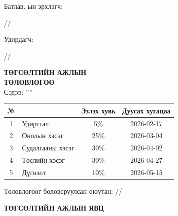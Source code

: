 
\begin{titlepage}

\vspace*{0.5cm}
Батлав. \deptname ын эрхлэгч: 
\begin{flushright}
\makebox[4cm]{\dotfill} /\chairname/ 
\end{flushright}

Удирдагч: 
\begin{flushright}
\makebox[4cm]{\dotfill} /\supname/
\end{flushright}

\begin{center}

\vspace*{2cm}
\textbf{{\large ТӨГСӨЛТИЙН АЖЛЫН \\ ТӨЛӨВЛӨГӨӨ}}\\[0.5cm]

\textsc{\large Сэдэв: ''\ttitle''}\\[0.5cm]

\begin{tabular}{|c|p{7cm}|c|c|}
	\hline
	№ & \makebox[7cm][c]{Ажлын бүлэг, хэсгийн нэр} & Эзлэх хувь & Дуусах хугацаа \\ \hline
	1 & {Удиртгал}         &  5\% & 2026-02-17 \\ \hline
	2 & {Онолын хэсэг}     & 25\% & 2026-03-04\\ \hline
	3 & {Судалгааны хэсэг} & 30\% & 2026-04-02 \\ \hline
	4 & {Төслийн хэсэг}    & 30\% & 2026-04-27 \\ \hline
	5 & {Дүгнэлт}          & 10\% & 2026-05-15 \\ \hline
\end{tabular}

\vspace{2cm}
Төлөвлөгөөг боловсруулсан оюутан: \makebox[3cm]{\dotfill} /\shortname/

\end{center}

\newpage

\begin{center}

\vspace*{2cm}
\textbf{{\large ТӨГСӨЛТИЙН АЖЛЫН ЯВЦ}}\\[0.5cm]


\end{center}
\end{titlepage}
